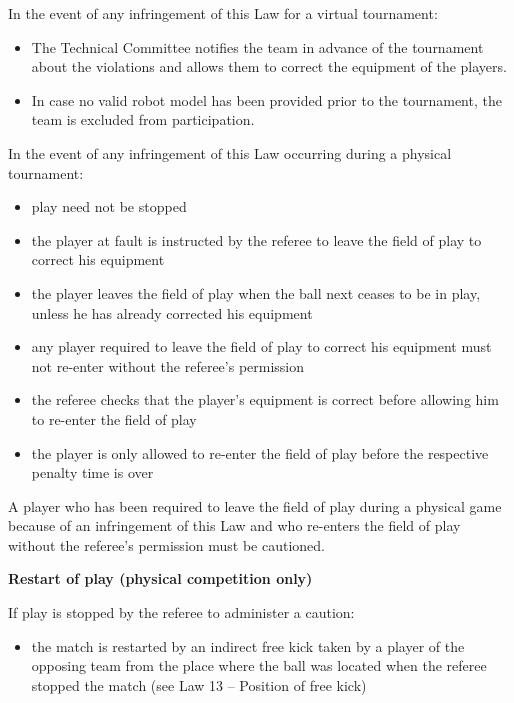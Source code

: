 \bigskip

In the event of any infringement of this Law for a virtual tournament:

\begin{itemize}
\item The Technical Committee notifies the team in advance of the tournament about the violations and allows them to correct the equipment of the players.
\item In case no valid robot model has been provided prior to the tournament, the team is excluded from participation.
\end{itemize}

In the event of any infringement of this Law occurring during a physical tournament:

\begin{itemize}
\item play need not be stopped
\item the player at fault is instructed by the referee to leave the field of play to correct his equipment
\item the player leaves the field of play when the ball next ceases to be in play, unless he has already corrected his equipment
\item any player required to leave the field of play to correct his equipment must not re-enter without the referee's permission
\item the referee checks that the player's equipment is correct before allowing him to re-enter the field of play
\item the player is only allowed to re-enter the field of play before the respective penalty time is over 
\end{itemize}

\bigskip

A player who has been required to leave the field of play during a physical game because of an infringement of this Law and who re-enters the field of play without the referee's permission must be cautioned.

\bigskip


\clearpage
{\bfseries Restart of play (physical competition only)}

\headlinebox

If play is stopped by the referee to administer a caution:

\begin{itemize}
\item the match is restarted by an indirect free kick taken by a player of the opposing team from the place where the ball was located when the referee stopped the match (see Law 13 -- Position of free kick)
\end{itemize}

